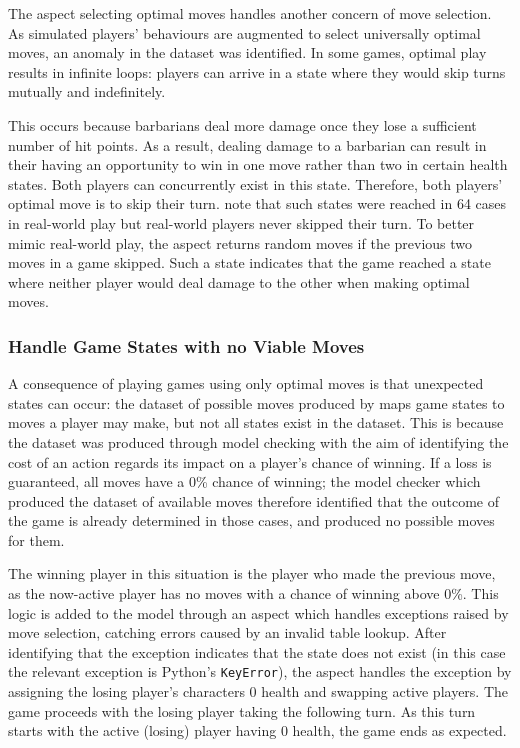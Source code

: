 The aspect selecting optimal moves handles another concern of move
selection. As simulated players' behaviours are augmented to select universally
optimal moves, an anomaly in the dataset was identified. In some games, optimal
play results in infinite loops: players can arrive in a state where they would
skip turns mutually and indefinitely.

This occurs because barbarians deal more damage once they lose a sufficient
number of hit points. As a result, dealing damage to a barbarian can result in
their having an opportunity to win in one move rather than two in certain health
states. Both players can concurrently exist in this state. Therefore, both
players' optimal move is to skip their turn. \citeauthor{kavanagh2021gameplay}
note that such states were reached in 64 cases in real-world play but real-world
players never skipped their turn. To better mimic real-world play, the aspect
returns random moves if the previous two moves in a game skipped. Such a state
indicates that the game reached a state where neither player would deal damage
to the other when making optimal moves.


\subsubsection{Handle Game States with no Viable Moves}

A consequence of playing games using only optimal moves is that unexpected
states can occur: the dataset of possible moves produced by
\citet{kavanagh2021thesis} maps game states to moves a player may make, but not
all states exist in the dataset. This is because the dataset was produced
through model checking with the aim of identifying the cost of an action regards
its impact on a player's chance of winning. If a loss is guaranteed, all moves
have a 0\% chance of winning; the model checker which produced the dataset of
available moves therefore identified that the outcome of the game is already
determined in those cases, and produced no possible moves for them. 

The winning player in this situation is the player who made the previous move,
as the now-active player has no moves with a chance of winning above 0\%. This
logic is added to the model through an aspect which handles exceptions raised by
move selection, catching errors caused by an invalid table lookup. After
identifying that the exception indicates that the state does not exist (in this
case the relevant exception is Python's \lstinline{KeyError}), the aspect
handles the exception by assigning the losing player's characters 0 health and
swapping active players. The game proceeds with the losing player taking the
following turn. As this turn starts with the active (losing) player having 0
health, the game ends as expected.


